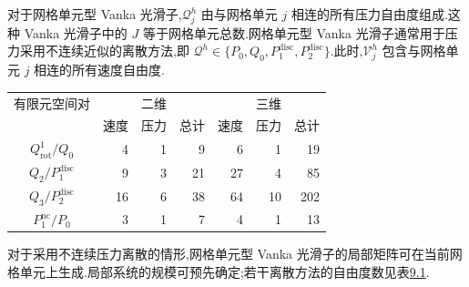 \begin{example}
\label{ex:chapter9-mesh-cell-vanka}
对于网格单元型 Vanka 光滑子,$\mathcal Q_j^h$ 由与网格单元 $j$ 相连的所有压力自由度组成.这种 Vanka 光滑子中的 $J$ 等于网格单元总数.网格单元型 Vanka 光滑子通常用于压力采用不连续近似的离散方法,即
$\mathcal Q^h\in\{P_0,Q_0,P_1^{\mathrm{disc}},P_2^{\mathrm{disc}}\}$.此时,$\mathcal V_j^h$ 包含与网格单元 $j$ 相连的所有速度自由度.

\begin{eleganttable}[0.94\linewidth]
\centering
{}
\label{tab:chapter9-mesh-cell-vanka-dofs}
\scriptsize
\setlength{\tabcolsep}{3.2pt}
\renewcommand{\arraystretch}{1.12}
\begin{tabular}{c|rrr|rrr}
\multicolumn{1}{c|}{有限元空间对} & \multicolumn{3}{c|}{二维} & \multicolumn{3}{c}{三维}\\
 & 速度 & 压力 & 总计 & 速度 & 压力 & 总计\\
\hline
$Q_{\mathrm{rot}}^1/Q_0$ & 4 & 1 & 9 & 6 & 1 & 19\\
$Q_2/P_1^{\mathrm{disc}}$ & 9 & 3 & 21 & 27 & 4 & 85\\
$Q_3/P_2^{\mathrm{disc}}$ & 16 & 6 & 38 & 64 & 10 & 202\\
$P_1^{\mathrm{nc}}/P_0$ & 3 & 1 & 7 & 4 & 1 & 13\\
\end{tabular}
\end{eleganttable}

对于采用不连续压力离散的情形,网格单元型 Vanka 光滑子的局部矩阵可在当前网格单元上生成.局部系统的规模可预先确定;若干离散方法的自由度数见表\hyperref[tab:chapter9-mesh-cell-vanka-dofs]{9.1}.
\end{example}



